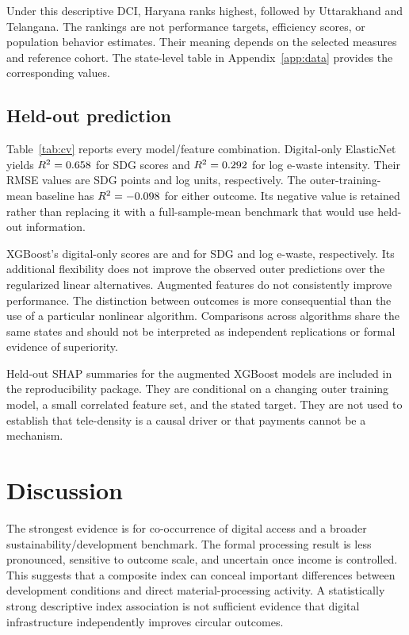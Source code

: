 \documentclass[11pt,a4paper]{article}
\begin{document}
Under this descriptive DCI, Haryana ranks highest, followed by Uttarakhand and Telangana. The rankings are not performance targets, efficiency scores, or population behavior estimates. Their meaning depends on the selected measures and reference cohort. The state-level table in Appendix~\ref{app:data} provides the corresponding values.

\subsection{Held-out prediction}
Table~\ref{tab:cv} reports every model/feature combination. Digital-only ElasticNet yields $R^2=0.658{}$ for SDG scores and $R^2=0.292{}$ for log e-waste intensity. Their RMSE values are \DigitalSDGRMSE{} SDG points and \DigitalEWasteRMSE{} log units, respectively. The outer-training-mean baseline has $R^2=-0.098{}$ for either outcome. Its negative value is retained rather than replacing it with a full-sample-mean benchmark that would use held-out information.

XGBoost's digital-only scores are \XGBSDGRtwo{} and \XGBEWasteRtwo{} for SDG and log e-waste, respectively. Its additional flexibility does not improve the observed outer predictions over the regularized linear alternatives. Augmented features do not consistently improve performance. The distinction between outcomes is more consequential than the use of a particular nonlinear algorithm. Comparisons across algorithms share the same states and should not be interpreted as independent replications or formal evidence of superiority.



Held-out SHAP summaries for the augmented XGBoost models are included in the reproducibility package. They are conditional on a changing outer training model, a small correlated feature set, and the stated target. They are not used to establish that tele-density is a causal driver or that payments cannot be a mechanism.

\section{Discussion}
The strongest evidence is for co-occurrence of digital access and a broader sustainability/development benchmark. The formal processing result is less pronounced, sensitive to outcome scale, and uncertain once income is controlled. This suggests that a composite index can conceal important differences between development conditions and direct material-processing activity. A statistically strong descriptive index association is not sufficient evidence that digital infrastructure independently improves circular outcomes.
\end{document}
